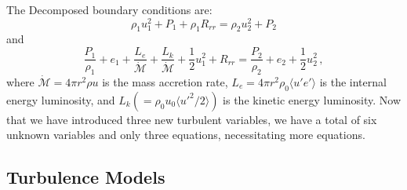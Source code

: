 \documentclass[twocolumn]{aastex6}
\newcommand{\mdot}{\dot{\mathcal{M}}}
\begin{document}
The Decomposed boundary conditions are:
\begin{equation}
\rho_1 u_1^2 + P_1 + \rho_1 R_{rr} = \rho_2 u_2^2 + P_2 
\label{demomentum}
\end{equation}
and
\begin{equation}
  \frac{P_1}{\rho_1} + e_1 + \frac{L_e}{\mdot} + \frac{L_k}{\mdot} + \frac{1}{2}u_1^2 + R_{rr} = \frac{P_2}{\rho_2} + e_2 + \frac{1}{2}u_2^2 \, ,
\label{deenergy}
\end{equation}
where $\dot{\mathcal{M}} = 4 \pi r^2 \rho u$ is the mass accretion rate, $L_e = 4 \pi r^2 \rho_0 \langle u' e' \rangle$ is the internal energy luminosity, and $L_k (= \rho_0 u_0 \langle u'^2/2 \rangle)$ is the kinetic energy luminosity. 
  Now that we have introduced three new
turbulent variables, we have a total of six unknown variables and only
three equations, necessitating more equations.

\subsection{Turbulence Models}
\label{Turbulence}

%
\end{document}
